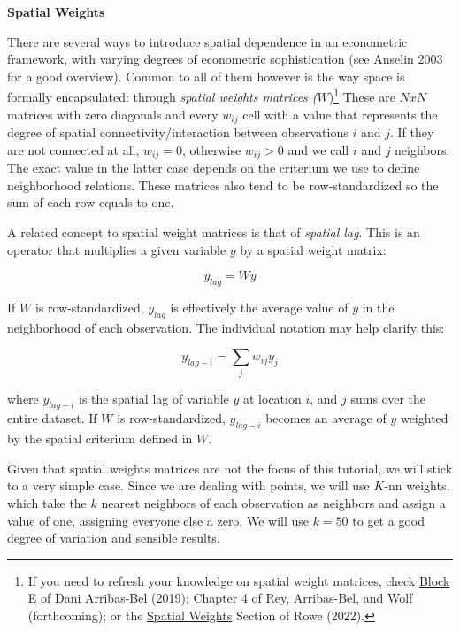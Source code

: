 \documentclass[
  letterpaper,
  krantz2]{style/krantz}
\begin{document}
\textbf{Spatial Weights}

There are several ways to introduce spatial dependence in an econometric
framework, with varying degrees of econometric sophistication (see
Anselin 2003 for a good overview). Common to all of them however is the
way space is formally encapsulated: through \emph{spatial weights
matrices (}\(W\))\footnote{If you need to refresh your knowledge on
  spatial weight matrices, check
  \href{https://darribas.org/gds_course/content/bE/concepts_E.html}{Block
  E} of Dani Arribas-Bel (2019);
  \href{https://geographicdata.science/book/notebooks/04_spatial_weights.html}{Chapter
  4} of Rey, Arribas-Bel, and Wolf (forthcoming); or the
  \href{https://fcorowe.github.io/intro-gds/03-spatial_weights.html}{Spatial
  Weights} Section of Rowe (2022).} These are \(NxN\) matrices with zero
diagonals and every \(w_{ij}\) cell with a value that represents the
degree of spatial connectivity/interaction between observations \(i\)
and \(j\). If they are not connected at all, \(w_{ij}=0\), otherwise
\(w_{ij}>0\) and we call \(i\) and \(j\) neighbors. The exact value in
the latter case depends on the criterium we use to define neighborhood
relations. These matrices also tend to be row-standardized so the sum of
each row equals to one.

A related concept to spatial weight matrices is that of \emph{spatial
lag}. This is an operator that multiplies a given variable \(y\) by a
spatial weight matrix:

\[
y_{lag} = W y
\]

If \(W\) is row-standardized, \(y_{lag}\) is effectively the average
value of \(y\) in the neighborhood of each observation. The individual
notation may help clarify this:

\[
y_{lag-i} = \displaystyle \sum_j w_{ij} y_j
\]

where \(y_{lag-i}\) is the spatial lag of variable \(y\) at location
\(i\), and \(j\) sums over the entire dataset. If \(W\) is
row-standardized, \(y_{lag-i}\) becomes an average of \(y\) weighted by
the spatial criterium defined in \(W\).

Given that spatial weights matrices are not the focus of this tutorial,
we will stick to a very simple case. Since we are dealing with points,
we will use \(K\)-nn weights, which take the \(k\) nearest neighbors of
each observation as neighbors and assign a value of one, assigning
everyone else a zero. We will use \(k=50\) to get a good degree of
variation and sensible results.
\end{document}

